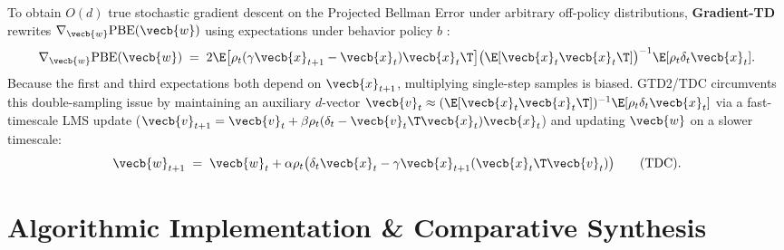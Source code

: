 \documentclass[../../../../master.tex]{subfiles}
\begin{document}
\begin{coremath}
To obtain $O(d)$ true stochastic gradient descent on the Projected Bellman Error under arbitrary off-policy distributions, \textbf{Gradient-TD} rewrites $\nabla_{\vecb{w}} \mathrm{PBE}(\vecb{w})$ using expectations under behavior policy $b$ :
\begin{equation}
  \nabla_{\vecb{w}} \mathrm{PBE}(\vecb{w}) \;=\; 2 \E\bigl[\rho_t (\gamma \vecb{x}_{t+1} - \vecb{x}_t)\vecb{x}_t\T\bigr] \bigl(\E[\vecb{x}_t \vecb{x}_t\T]\bigr)^{-1} \E[\rho_t \delta_t \vecb{x}_t].
  \label{eq:td:pbe}
\end{equation}
Because the first and third expectations both depend on $\vecb{x}_{t+1}$, multiplying single-step samples is biased. GTD2/TDC circumvents this double-sampling issue by maintaining an auxiliary $d$-vector $\vecb{v}_t \approx (\E[\vecb{x}_t \vecb{x}_t\T])^{-1} \E[\rho_t \delta_t \vecb{x}_t]$ via a fast-timescale LMS update ($\vecb{v}_{t+1} = \vecb{v}_t + \beta \rho_t (\delta_t - \vecb{v}_t\T \vecb{x}_t) \vecb{x}_t$) and updating $\vecb{w}$ on a slower timescale:
\begin{equation}
  \vecb{w}_{t+1} \;=\; \vecb{w}_t + \alpha \rho_t \bigl(\delta_t \vecb{x}_t - \gamma \vecb{x}_{t+1} (\vecb{x}_t\T \vecb{v}_t)\bigr) \qquad (\text{TDC}).
  \label{eq:td:gtd2}
\end{equation}
\end{coremath}

\section{Algorithmic Implementation \& Comparative Synthesis}
\label{sec:td:algorithms}
\end{document}
